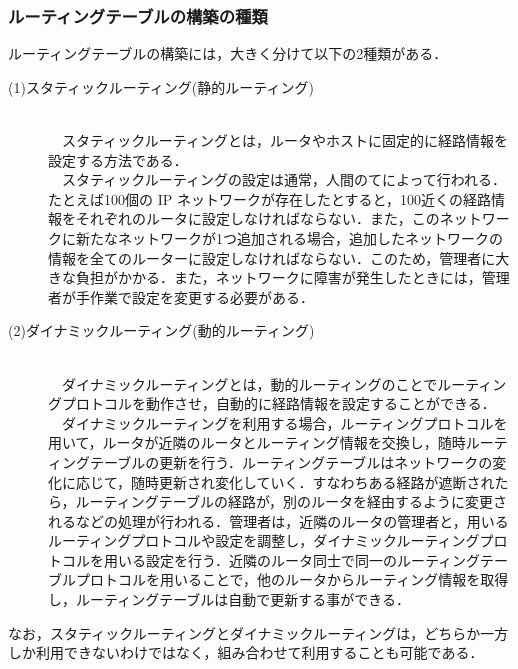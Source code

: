 \documentclass[a4j,titlepage]{jarticle}
\begin{document}
\subsubsection{ルーティングテーブルの構築の種類}
ルーティングテーブルの構築には，大きく分けて以下の2種類がある．
\begin{description}
\item[(1)スタティックルーティング(静的ルーティング)]\mbox{}\\
　スタティックルーティングとは，ルータやホストに固定的に経路情報を設定する方法である．\\
　スタティックルーティングの設定は通常，人間のてによって行われる．たとえば100個の IP ネットワークが存在したとすると，100近くの経路情報をそれぞれのルータに設定しなければならない．また，このネットワークに新たなネットワークが1つ追加される場合，追加したネットワークの情報を全てのルーターに設定しなければならない．このため，管理者に大きな負担がかかる．また，ネットワークに障害が発生したときには，管理者が手作業で設定を変更する必要がある\cite{bib:iptext}．

\item[(2)ダイナミックルーティング(動的ルーティング)]\mbox{}\\
　ダイナミックルーティングとは，動的ルーティングのことでルーティングプロトコルを動作させ，自動的に経路情報を設定することができる．\\
　ダイナミックルーティングを利用する場合，ルーティングプロトコルを用いて，ルータが近隣のルータとルーティング情報を交換し，随時ルーティングテーブルの更新を行う．ルーティングテーブルはネットワークの変化に応じて，随時更新され変化していく．すなわちある経路が遮断されたら，ルーティングテーブルの経路が，別のルータを経由するように変更されるなどの処理が行われる．管理者は，近隣のルータの管理者と，用いるルーティングプロトコルや設定を調整し，ダイナミックルーティングプロトコルを用いる設定を行う．近隣のルータ同士で同一のルーティングテーブルプロトコルを用いることで，他のルータからルーティング情報を取得し，ルーティングテーブルは自動で更新する事ができる．
\end{description}

なお，スタティックルーティングとダイナミックルーティングは，どちらか一方しか利用できないわけではなく，組み合わせて利用することも可能である\cite{bib:iptext}．
\end{document}
